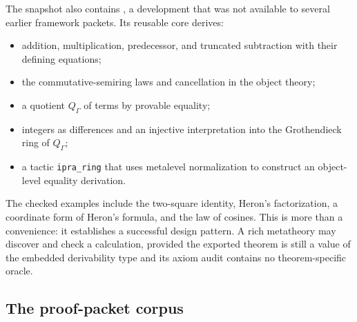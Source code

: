 The snapshot also contains , a development that was not available to several earlier framework packets.  Its reusable core derives:
\begin{itemize}
  \item addition, multiplication, predecessor, and truncated subtraction with their defining equations;
  \item the commutative-semiring laws and cancellation in the object theory;
  \item a quotient \(Q_\Gamma\) of terms by provable equality;
  \item integers as differences and an injective interpretation into the Grothendieck ring of \(Q_\Gamma\);
  \item a tactic \texttt{ipra\_ring} that uses metalevel normalization to construct an object-level equality derivation.
\end{itemize}
The checked examples include the two-square identity, Heron's factorization, a coordinate form of Heron's formula, and the law of cosines.  This is more than a convenience: it establishes a successful design pattern.  A rich metatheory may discover and check a calculation, provided the exported theorem is still a value of the embedded derivability type and its axiom audit contains no theorem-specific oracle.

\subsection{The proof-packet corpus}

